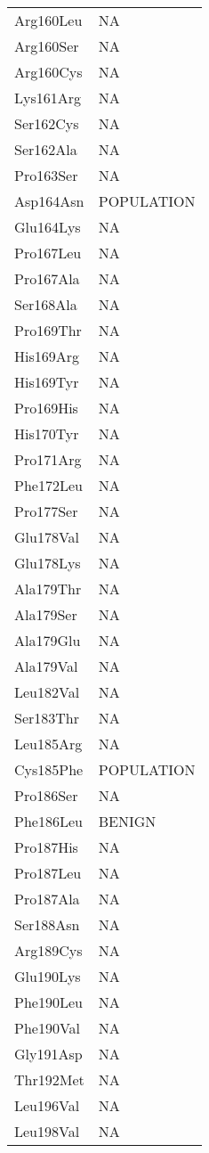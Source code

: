 \begin{tiny}
\begin{longtable}[l]{l|l}
	Arg160Leu & NA \\
	Arg160Ser & NA \\
	Arg160Cys & NA \\
	Lys161Arg & NA \\
	Ser162Cys & NA \\
	Ser162Ala & NA \\
	Pro163Ser & NA \\
	Asp164Asn & POPULATION \\
	Glu164Lys & NA \\
	Pro167Leu & NA \\
	Pro167Ala & NA \\
	Ser168Ala & NA \\
	Pro169Thr & NA \\
	His169Arg & NA \\
	His169Tyr & NA \\
	Pro169His & NA \\
	His170Tyr & NA \\
	Pro171Arg & NA \\
	Phe172Leu & NA \\
	Pro177Ser & NA \\
	Glu178Val & NA \\
	Glu178Lys & NA \\
	Ala179Thr & NA \\
	Ala179Ser & NA \\
	Ala179Glu & NA \\
	Ala179Val & NA \\
	Leu182Val & NA \\
	Ser183Thr & NA \\
	Leu185Arg & NA \\
	Cys185Phe & POPULATION \\
	Pro186Ser & NA \\
	Phe186Leu & BENIGN \\
	Pro187His & NA \\
	Pro187Leu & NA \\
	Pro187Ala & NA \\
	Ser188Asn & NA \\
	Arg189Cys & NA \\
	Glu190Lys & NA \\
	Phe190Leu & NA \\
	Phe190Val & NA \\
	Gly191Asp & NA \\
	Thr192Met & NA \\
	Leu196Val & NA \\
	Leu198Val & NA \\

\end{longtable}
\end{tiny}
